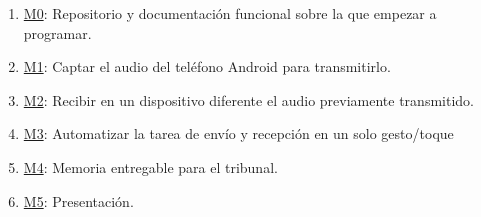 \begin{enumerate}
    \item \href{https://github.com/migueorg/One-touch-music-streaming-TFG-ETSIIT/milestone/1}{M0}: Repositorio y documentación funcional sobre la que empezar a programar.
    \item \href{https://github.com/migueorg/One-touch-music-streaming-TFG-ETSIIT/milestone/2}{M1}: Captar el audio del teléfono Android para transmitirlo.
    \item \href{https://github.com/migueorg/One-touch-music-streaming-TFG-ETSIIT/milestone/3}{M2}: Recibir en un dispositivo diferente el audio previamente transmitido.
    \item \href{https://github.com/migueorg/One-touch-music-streaming-TFG-ETSIIT/milestone/4}{M3}: Automatizar la tarea de envío y recepción en un solo gesto/toque
    \item \href{https://github.com/migueorg/One-touch-music-streaming-TFG-ETSIIT/milestone/5}{M4}: Memoria entregable para el tribunal.
    \item \href{https://github.com/migueorg/One-touch-music-streaming-TFG-ETSIIT/milestone/6}{M5}: Presentación.
\end{enumerate}